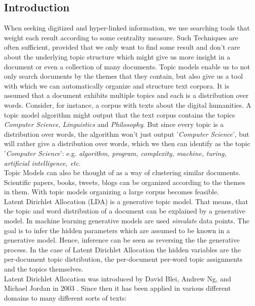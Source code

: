 \documentclass[a4paper,ngerman]{atseminar}
\begin{document}
\subsection{Introduction}
When seeking digitized and hyper-linked information, we use searching tools that
weight each result according to some centrality measure. Such Techniques are 
often sufficient, provided that we only want to find some result and don't care
about the underlying topic structure which might give us more insight in a document or
even a collection of many documents.
Topic models enable us to not only search documents by the themes that they contain, but
also give us a tool with which we can automatically organize and structure text corpora.
It is assumed that a document exhibits multiple topics and each 
is a distribution over words. Consider, for instance, a corpus with texts about 
the digital humanities. A topic model algorithm might output that the text corpus
contains the topics \textit{Computer Science}, \textit{Linguistics} and \textit{Philosophy}.
But since every topic is a distribution over words, the algorithm won't just output '\textit{Computer Science}', 
but will rather give a distribution over words, which we then can identify as the topic '\textit{Computer Science}':
e.g. \textit{algorithm, program, complexity, machine, turing, artificial intelligence, etc}.
\\
Topic Models can also be thought of as a way of clustering similar documents.
Scientific papers, books, tweets, blogs can be organized according to the 
themes in them. With topic models organizing a large corpus becomes feasible. \\
Latent Dirichlet Allocation (LDA) is a generative topic model. That means, that 
the topic and word distribution of a document can be explained by a generative
model. In machine learning generative models are used \textit{simulate} data points.
The goal is to infer the hidden parameters which are assumed to be known in a 
generative model. Hence, inference can be seen as reversing the the generative 
process. In the case of Latent Dirichlet Allocation the hidden variables are the
per-document topic distribution, the per-document per-word topic assignments and
the topics themselves. \\
Latent Dirichlet Allocation was introduced by David Blei, Andrew Ng, and Michael Jordan in 2003 \cite{blei2003latent}.
Since then it has been applied in various different domains to many different sorts of texts:
\end{document}
